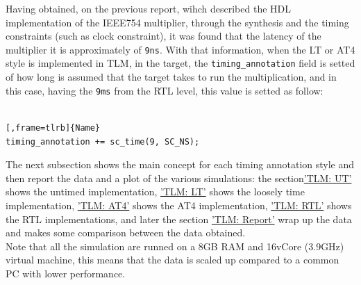 \documentclass[]{IEEEtran}
\begin{document}
		Having obtained, on the previous report, wihch described the HDL implementation of the IEEE754 multiplier,  through the synthesis and the timing constraints (such as clock constraint), it was found that the latency of the multiplier it is approximately of \verb|9ns|. With that information, when the LT or AT4 style is implemented in TLM, in the target, the \verb|timing_annotation| field is setted of how long is assumed that the target takes to run the multiplication, and in this case, having the \verb|9ms| from the RTL level, this value is setted as follow:
						\\
		\\
		\noindent
		\begin{minipage}{.45\textwidth}
			\begin{lstlisting}[,frame=tlrb]{Name}
timing_annotation += sc_time(9, SC_NS);
			\end{lstlisting}
		\end{minipage}\hfill
		
		The next subsection shows the main concept for each timing annotation style and then report the data and a plot of the various simulations: the section\hyperref[sec:ut]{'TLM: UT'} shows the untimed implementation, \hyperref[sec:lt]{'TLM: LT'} shows the loosely time implementation, \hyperref[sec:at4]{'TLM: AT4'} shows the AT4 implementation, \hyperref[sec:rtlimpl]{'TLM: RTL'} shows the RTL implementations, and later the section \hyperref[sec:ltmreport]{'TLM: Report'} wrap up the data and makes some comparison between the data obtained.
		\\
		Note that all the simulation are runned on a 8GB RAM and 16vCore (3.9GHz) virtual machine, this means that the data is scaled up compared to a common PC with lower performance.
		
\end{document}
